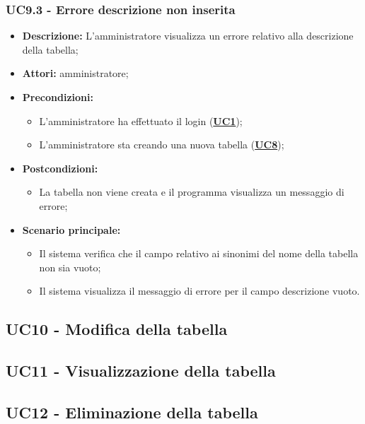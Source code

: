 \documentclass[5pt]{article}
\begin{document}
\subsubsection{UC9.3 - Errore descrizione non inserita}
\label{sec:UC9.3}
\begin{itemize}
	\item \textbf{Descrizione:} L’amministratore visualizza un errore relativo alla descrizione della tabella;
	\item \textbf{Attori:} amministratore;
	\item \textbf{Precondizioni:} 
	\begin{itemize}
		\item L’amministratore ha effettuato il login (\hyperref[sec:UC1]{\textbf{UC1}});
		\item L’amministratore sta creando una nuova tabella (\hyperref[sec:UC1]{\textbf{UC8}});
	\end{itemize}
	\item \textbf{Postcondizioni:} 
	\begin{itemize}
		\item La tabella non viene creata e il programma visualizza un messaggio di errore;
	\end{itemize}
	\item \textbf{Scenario principale:} 
	\begin{itemize}
		\item Il sistema verifica che il campo relativo ai sinonimi del nome della tabella non sia vuoto;
		\item Il sistema visualizza il messaggio di errore per il campo descrizione vuoto.
	\end{itemize}
\end{itemize}

\subsection{UC10 - Modifica della tabella}
\label{sec:UC10}

\subsection{UC11 - Visualizzazione della tabella}
\label{sec:UC11}

\subsection{UC12 - Eliminazione della tabella}
\label{sec:UC12}
\end{document}
